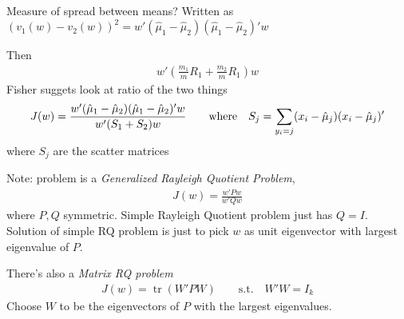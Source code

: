\documentclass[12pt]{book}
\numberwithin{equation}{section} %
\theoremstyle{plain}
\theoremstyle{definition}
\theoremstyle{remark}
\newcommand{\trace}{\operatorname{tr}}
\begin{document}
Measure of spread between means?
Written as
$(v_1(w)-v_2(w))^2=w'(\hat{\mu}_1-\hat{\mu}_2)(\hat{\mu}_1-\hat{\mu}_2)'w$

Then
\begin{align*}
  w'\left(
  \frac{m_1}{m}R_1
  +
  \frac{m_2}{m}R_1
  \right)w
\end{align*}
Fisher suggets look at ratio of the two things
\begin{align*}
  J(w)=
  \frac{%
    w'(\hat{\mu}_1-\hat{\mu}_2)(\hat{\mu}_1-\hat{\mu}_2)'w
  }{%
    w'(S_1+S_2)w
  }
  \qquad\text{where}\quad
  S_j
  = \sum_{y_i=j} (x_i-\hat{\mu}_j)(x_i-\hat{\mu}_j)'
\end{align*}
where $S_j$ are the scatter matrices

Note: problem is a \emph{Generalized Rayleigh Quotient Problem},
\begin{align*}
  J(w)=\frac{w'P w}{w'Q w}
\end{align*}
where $P,Q$ symmetric.
Simple Rayleigh Quotient problem just has $Q=I$.
Solution of simple RQ problem is just to pick $w$ as unit eigenvector
with largest eigenvalue of $P$.

There's also a \emph{Matrix RQ problem}
\begin{align*}
  J(w) = \trace(W'PW)
  \qquad\text{s.t.}\quad
  W'W = I_k
\end{align*}
Choose $W$ to be the eigenvectors of $P$ with the largest eigenvalues.
\end{document}
